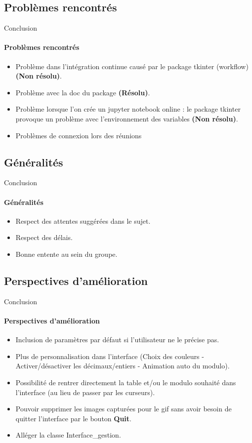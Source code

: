 \documentclass{beamer}
\begin{document}
\subsection{Problèmes rencontrés}
\begin{frame}{Conclusion}
\framesubtitle{Problèmes rencontrés}
\begin{itemize} 
\item Problème dans l'intégration continue causé par le package tkinter (workflow) \textbf{(Non résolu)}.
\item Problème avec la doc du package \textbf{(Résolu)}.
\item Problème lorsque l'on crée un jupyter notebook online : le package tkinter provoque un problème avec l'environnement des variables \textbf{(Non résolu)}.
\item Problèmes de connexion lors des réunions 
\end{itemize}
\end{frame}

\subsection{Généralités}
\begin{frame}{Conclusion}
\framesubtitle{Généralités}
\begin{itemize}
\item Respect des attentes suggérées dans le sujet.
\item Respect des délais.
\item Bonne entente au sein du groupe.
\end{itemize}
\end{frame}

\subsection{Perspectives d'amélioration}
\begin{frame}{Conclusion}
\framesubtitle{Perspectives d'amélioration}
\begin{itemize}
    \item Inclusion de paramètres par défaut si l'utilisateur ne le précise pas. 
    \item Plus de personnalisation dans l'interface (Choix des couleurs - Activer/désactiver les décimaux/entiers - Animation auto du modulo).
    \item Possibilité de rentrer directement la table et/ou le modulo souhaité dans l'interface (au lieu de passer par les curseurs).
    \item Pouvoir supprimer les images capturées pour le gif sans avoir besoin de quitter l'interface par le bouton \textbf{Quit}.
    \item Alléger la classe Interface\_gestion.
\end{itemize}
\end{frame}
\end{document}
